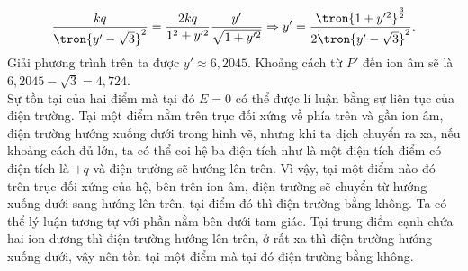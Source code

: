 \begin{loigiai}
        \begin{equation*}
            \dfrac{kq}{\tron{y'-\sqrt{3}}^2}=\dfrac{2kq}{1^2+y'^2}\dfrac{y'}{\sqrt{1+y'^2}}\Rightarrow y'=\dfrac{\tron{1+y'^2}^{\frac{3}{2}}}{2\tron{y'-\sqrt{3}}^2}.
        \end{equation*}
        Giải phương trình trên ta được $y'\approx6,2045$. Khoảng cách từ $P'$ đến ion âm sẽ là $6,2045-\sqrt{3}=4,724$.\\
        Sự tồn tại của hai điểm mà tại đó $E=0$ có thể được lí luận bằng sự liên tục của điện trường. Tại một điểm nằm trên trục đối xứng về phía trên và gần ion âm, điện trường hướng xuống dưới trong hình vẽ, nhưng khi ta dịch chuyển ra xa, nếu khoảng cách đủ lớn, ta có thể coi hệ ba điện tích như là một điện tích điểm có điện tích là $+q$ và điện trường sẽ hướng lên trên. Vì vậy, tại một điểm nào đó trên trục đối xứng của hệ, bên trên ion âm, điện trường sẽ chuyển từ hướng xuống dưới sang hướng lên trên, tại điểm đó thì điện trường bằng không. Ta có thể lý luận tương tự với phần nằm bên dưới tam giác. Tại trung điểm cạnh chứa hai ion dương thì điện trường hướng lên trên, ở rất xa thì điện trường hướng xuống dưới, vậy nên tồn tại một điểm mà tại đó điện trường bằng không.
    \end{loigiai}
    
